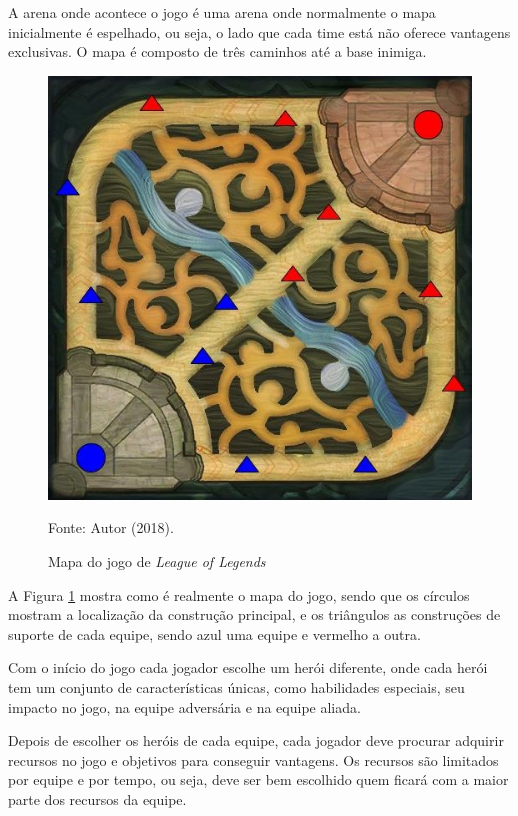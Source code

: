 	A arena onde acontece o jogo é uma arena onde normalmente o mapa inicialmente é  espelhado,  ou  seja, o lado que cada time está não  oferece vantagens  exclusivas.  O mapa é composto  de  três caminhos até a base inimiga.
    

\begin{figure}[H]
	\caption{Mapa do jogo de \textit{League of Legends}}
	\begin{center}
		\includegraphics{imagens/mapa_lol.jpg}
	\end{center}
	\small{Fonte: Autor (2018).}
	\label{fig:mapa_lol}
\end{figure}

	A Figura \ref{fig:mapa_lol} mostra como é realmente o mapa do jogo, sendo que os círculos mostram a localização da construção principal, e os triângulos as construções de suporte de cada equipe, sendo azul uma equipe e vermelho a outra.
    
	Com o início do jogo cada jogador escolhe  um  herói  diferente, onde  cada  herói tem um conjunto de características únicas, como habilidades especiais,  seu impacto  no jogo,  na equipe adversária e na equipe aliada.
    
	Depois de escolher os heróis de cada equipe, cada jogador deve procurar adquirir recursos no jogo e objetivos para conseguir vantagens. Os recursos são limitados por equipe e por tempo, ou seja, deve ser bem escolhido quem ficará com a maior parte dos recursos da equipe.

